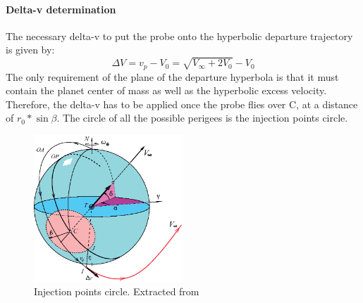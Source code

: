 \paragraph{Delta-v determination}
The necessary delta-v to put the probe onto the hyperbolic departure trajectory is given by:
\begin{equation}
	\Delta V=v_p-V_0=\sqrt{V_\infty+2V_0}-V_0
\end{equation}
The only requirement of the plane of the departure hyperbola is that it must contain the planet center of mass as well as the hyperbolic excess velocity. Therefore, the delta-v has to be applied once the probe flies over C, at a distance of $r_0*\sin \beta$. The circle of all the possible perigees is the injection points circle.
\begin{figure}[H]
	\centering
	\includegraphics[width=0.5\textwidth]{././images/1stStage3} 
	\caption{Injection points circle. Extracted from~\cite{PCA}}
\end{figure}


